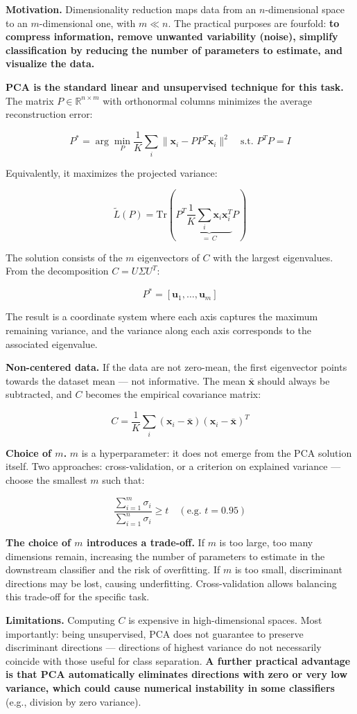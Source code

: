 \textbf{Motivation.} Dimensionality reduction maps data from an $n$-dimensional space to an $m$-dimensional one, with $m \ll n$. The practical purposes are fourfold: \textbf{to compress information, remove unwanted variability (noise), simplify classification by reducing the number of parameters to estimate, and visualize the data.}

\textbf{PCA is the standard linear and unsupervised technique for this task.} The matrix $P \in \mathbb{R}^{n \times m}$ with orthonormal columns minimizes the average reconstruction error:

$$P^* = \arg\min_P \frac{1}{K}\sum_i \|\mathbf{x}_i - PP^T\mathbf{x}_i\|^2 \quad \text{s.t. } P^TP = I$$

Equivalently, it maximizes the projected variance:

$$\widetilde{L}(P) = \text{Tr}\!\left(P^T \underbrace{\frac{1}{K}\sum_i \mathbf{x}_i\mathbf{x}_i^T}_{=\,C} P\right)$$

The solution consists of the $m$ eigenvectors of $C$ with the largest eigenvalues. From the decomposition $C = U\Sigma U^T$:

$$P^* = [\mathbf{u}_1, \ldots, \mathbf{u}_m]$$

The result is a coordinate system where each axis captures the maximum remaining variance, and the variance along each axis corresponds to the associated eigenvalue.

\textbf{Non-centered data.} If the data are not zero-mean, the first eigenvector points towards the dataset mean — not informative. The mean $\bar{\mathbf{x}}$ should always be subtracted, and $C$ becomes the empirical covariance matrix:

$$C = \frac{1}{K}\sum_i (\mathbf{x}_i - \bar{\mathbf{x}})(\mathbf{x}_i - \bar{\mathbf{x}})^T$$

\textbf{Choice of $m$.} $m$ is a hyperparameter: it does not emerge from the PCA solution itself. Two approaches: cross-validation, or a criterion on explained variance — choose the smallest $m$ such that:

$$\frac{\sum_{i=1}^{m} \sigma_i}{\sum_{i=1}^{n} \sigma_i} \geq t \quad (\text{e.g. } t = 0.95)$$

\textbf{The choice of $m$ introduces a trade-off.} If $m$ is too large, too many dimensions remain, increasing the number of parameters to estimate in the downstream classifier and the risk of overfitting. If $m$ is too small, discriminant directions may be lost, causing underfitting. Cross-validation allows balancing this trade-off for the specific task.

\textbf{Limitations.} Computing $C$ is expensive in high-dimensional spaces. Most importantly: being unsupervised, PCA does not guarantee to preserve discriminant directions — directions of highest variance do not necessarily coincide with those useful for class separation. \textbf{A further practical advantage is that PCA automatically eliminates directions with zero or very low variance, which could cause numerical instability in some classifiers} (e.g., division by zero variance).
